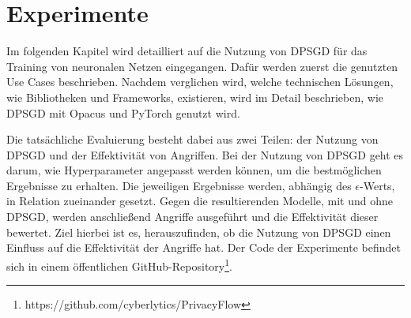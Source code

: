 \chapter{Experimente}\label{ch:experiments}

Im folgenden Kapitel wird detailliert auf die Nutzung von DPSGD für das Training von neuronalen Netzen eingegangen.
Dafür werden zuerst die genutzten Use Cases beschrieben.
Nachdem verglichen wird, welche technischen Lösungen, wie Bibliotheken und Frameworks, existieren, wird im Detail beschrieben, wie DPSGD mit Opacus und PyTorch genutzt wird.

Die tatsächliche Evaluierung besteht dabei aus zwei Teilen: der Nutzung von DPSGD und der Effektivität von Angriffen.
Bei der Nutzung von DPSGD geht es darum, wie Hyperparameter angepasst werden können, um die bestmöglichen Ergebnisse zu erhalten.
Die jeweiligen Ergebnisse werden, abhängig des $\epsilon$-Werts, in Relation zueinander gesetzt.
Gegen die resultierenden Modelle, mit und ohne DPSGD, werden anschließend Angriffe ausgeführt und die Effektivität dieser bewertet. 
Ziel hierbei ist es, herauszufinden, ob die Nutzung von DPSGD einen Einfluss auf die Effektivität der Angriffe hat.
Der Code der Experimente befindet sich in einem öffentlichen GitHub-Repository\footnote{https://github.com/cyberlytics/PrivacyFlow}.















